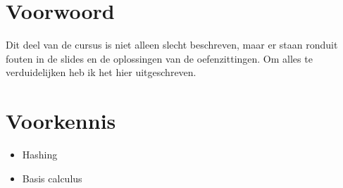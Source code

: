 \documentclass[indexstructuren.tex]{subfiles}
\begin{document}
\section*{Voorwoord}
Dit deel van de cursus is niet alleen slecht beschreven, maar er staan ronduit fouten in de slides en de oplossingen van de oefenzittingen. Om alles te verduidelijken heb ik het hier uitgeschreven.

\section*{Voorkennis}
\begin{itemize}
\item Hashing
\item Basis calculus
\end{itemize}
\end{document}
